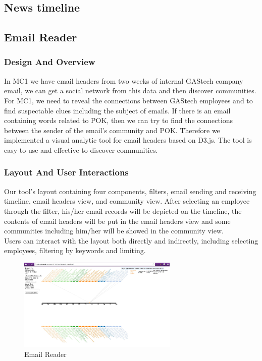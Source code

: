 \documentclass{vgtc}                          %
\begin{document}
\subsection{News timeline}


\subsection{Email Reader}
\subsubsection{Design And Overview}
In MC1 we have email headers from two weeks of internal GAStech company email, we can get a social network from this data and then discover communities. For MC1, we need to reveal the connections between GAStech employees and to find suspectable clues including the subject of emails. If there is an email containing words related to POK, then we can try to find the connections between the sender of the email's community and POK. Therefore we implemented a visual analytic tool for email headers based on D3.js. The tool is easy to use and effective to discover communities. 

\subsubsection{Layout And User Interactions}
Our tool's layout containing four components, filters, email sending and receiving timeline, email headers view, and community view.
After selecting an employee through the filter, his/her email records will be depicted on the timeline, the contents of email headers will be put in the email headers view and some communities including him/her will be showed in the community view.  \\
Users can interact with the layout both directly and indirectly, including selecting employees, filtering by keywords and limiting. 
\begin{figure}[htb]
  \centering
  \includegraphics[width=3in]{image_et.png}
  \caption{Email Reader}
\end{figure}
\end{document}
